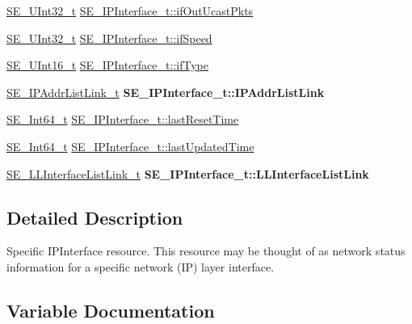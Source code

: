 \begin{DoxyCompactItemize}
\hyperlink{group__UInt32_ga70bd4ecda3c0c85d20779d685a270cdb}{S\+E\+\_\+\+U\+Int32\+\_\+t} \hyperlink{group__IPInterface_ga9847e8d8b59bc52be1f0db9b1fb7d650}{S\+E\+\_\+\+I\+P\+Interface\+\_\+t\+::if\+Out\+Ucast\+Pkts}
\item 
\hyperlink{group__UInt32_ga70bd4ecda3c0c85d20779d685a270cdb}{S\+E\+\_\+\+U\+Int32\+\_\+t} \hyperlink{group__IPInterface_gae1997df959264a39cb3856f623062744}{S\+E\+\_\+\+I\+P\+Interface\+\_\+t\+::if\+Speed}
\item 
\hyperlink{group__UInt16_gac68d541f189538bfd30cfaa712d20d29}{S\+E\+\_\+\+U\+Int16\+\_\+t} \hyperlink{group__IPInterface_gaf4e4fb764ff9c6a0fdd5e907aaa1bf54}{S\+E\+\_\+\+I\+P\+Interface\+\_\+t\+::if\+Type}
\item 
\mbox{\label{group__IPInterface_ga9e4f0e2f28cca33112d450384eb4a653}} 
\hyperlink{structSE__IPAddrListLink__t}{S\+E\+\_\+\+I\+P\+Addr\+List\+Link\+\_\+t} {\bfseries S\+E\+\_\+\+I\+P\+Interface\+\_\+t\+::\+I\+P\+Addr\+List\+Link}
\item 
\hyperlink{group__Int64_ga946a01895d7edbdd190770677f54f2c6}{S\+E\+\_\+\+Int64\+\_\+t} \hyperlink{group__IPInterface_gaba7ccbfae459fd5b6e12f97f3730590f}{S\+E\+\_\+\+I\+P\+Interface\+\_\+t\+::last\+Reset\+Time}
\item 
\hyperlink{group__Int64_ga946a01895d7edbdd190770677f54f2c6}{S\+E\+\_\+\+Int64\+\_\+t} \hyperlink{group__IPInterface_gad0d107ce89620b97d98d21a404994324}{S\+E\+\_\+\+I\+P\+Interface\+\_\+t\+::last\+Updated\+Time}
\item 
\mbox{\label{group__IPInterface_ga8d8dcafc14ee6b276d0d949321953b3e}} 
\hyperlink{structSE__LLInterfaceListLink__t}{S\+E\+\_\+\+L\+L\+Interface\+List\+Link\+\_\+t} {\bfseries S\+E\+\_\+\+I\+P\+Interface\+\_\+t\+::\+L\+L\+Interface\+List\+Link}
\end{DoxyCompactItemize}


\subsection{Detailed Description}
Specific I\+P\+Interface resource. This resource may be thought of as network status information for a specific network (IP) layer interface. 

\subsection{Variable Documentation}
\mbox{\label{group__IPInterface_gace4102e6c256f2507297836fe17fff28}} 
